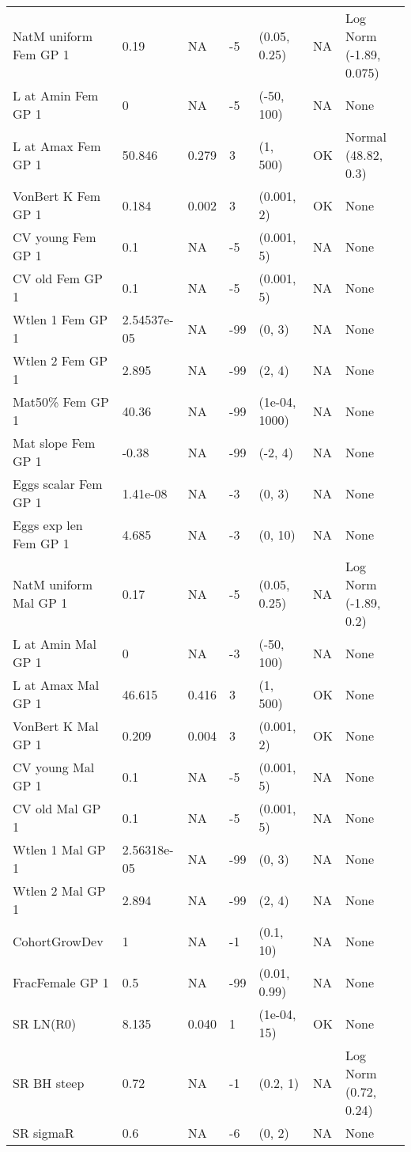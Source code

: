 \documentclass[11pt,
  letterpaper,
]{article}
\begin{document}
\begin{landscape}
\begin{longtable}[t]{>{\raggedright\arraybackslash}p{7.5cm}lllll>{\raggedright\arraybackslash}p{3.5cm}}
\endfoot
\bottomrule
\endlastfoot
NatM uniform Fem GP 1 & 0.19 & NA & -5 & (0.05, 0.25) & NA & Log Norm (-1.89, 0.075)\\
L at Amin Fem GP 1 & 0 & NA & -5 & (-50, 100) & NA & None\\
L at Amax Fem GP 1 & 50.846 & 0.279 & 3 & (1, 500) & OK & Normal (48.82, 0.3)\\
VonBert K Fem GP 1 & 0.184 & 0.002 & 3 & (0.001, 2) & OK & None\\
CV young Fem GP 1 & 0.1 & NA & -5 & (0.001, 5) & NA & None\\
CV old Fem GP 1 & 0.1 & NA & -5 & (0.001, 5) & NA & None\\
Wtlen 1 Fem GP 1 & 2.54537e-05 & NA & -99 & (0, 3) & NA & None\\
Wtlen 2 Fem GP 1 & 2.895 & NA & -99 & (2, 4) & NA & None\\
Mat50\% Fem GP 1 & 40.36 & NA & -99 & (1e-04, 1000) & NA & None\\
Mat slope Fem GP 1 & -0.38 & NA & -99 & (-2, 4) & NA & None\\
Eggs scalar Fem GP 1 & 1.41e-08 & NA & -3 & (0, 3) & NA & None\\
Eggs exp len Fem GP 1 & 4.685 & NA & -3 & (0, 10) & NA & None\\
NatM uniform Mal GP 1 & 0.17 & NA & -5 & (0.05, 0.25) & NA & Log Norm (-1.89, 0.2)\\
L at Amin Mal GP 1 & 0 & NA & -3 & (-50, 100) & NA & None\\
L at Amax Mal GP 1 & 46.615 & 0.416 & 3 & (1, 500) & OK & None\\
VonBert K Mal GP 1 & 0.209 & 0.004 & 3 & (0.001, 2) & OK & None\\
CV young Mal GP 1 & 0.1 & NA & -5 & (0.001, 5) & NA & None\\
CV old Mal GP 1 & 0.1 & NA & -5 & (0.001, 5) & NA & None\\
Wtlen 1 Mal GP 1 & 2.56318e-05 & NA & -99 & (0, 3) & NA & None\\
Wtlen 2 Mal GP 1 & 2.894 & NA & -99 & (2, 4) & NA & None\\
CohortGrowDev & 1 & NA & -1 & (0.1, 10) & NA & None\\
FracFemale GP 1 & 0.5 & NA & -99 & (0.01, 0.99) & NA & None\\
SR LN(R0) & 8.135 & 0.040 & 1 & (1e-04, 15) & OK & None\\
SR BH steep & 0.72 & NA & -1 & (0.2, 1) & NA & Log Norm (0.72, 0.24)\\
SR sigmaR & 0.6 & NA & -6 & (0, 2) & NA & None\\

\end{longtable}
\end{landscape}
\end{document}
